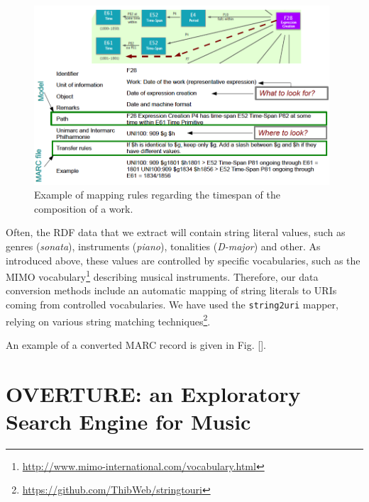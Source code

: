 \documentclass[runningheads,a4paper]{llncs}
\begin{document}
\begin{figure}
  \centering
  \includegraphics[width=11cm]{img/mapping-rules.png}
  \caption{Example of mapping rules regarding the timespan of the composition of a work.}
  \label{fig:mappings}
\end{figure}

Often, the RDF data that we extract will contain string literal values, such as genres ({\it sonata}), instruments ({\it piano}), tonalities ({\it D-major}) and other. As introduced above, these values are controlled by specific vocabularies, such as the MIMO vocabulary\footnote{\url{http://www.mimo-international.com/vocabulary.html}} describing musical instruments. Therefore, our data conversion methods include an automatic mapping of string literals to URIs coming from controlled vocabularies. We have used the {\tt string2uri} mapper, relying on various string matching techniques\footnote{\url{https://github.com/ThibWeb/stringtouri}}.

An example of a converted MARC record is given in Fig. \ref{}. %


\section{OVERTURE: an Exploratory Search Engine for Music}
\label{sec:overture}



\end{document}
